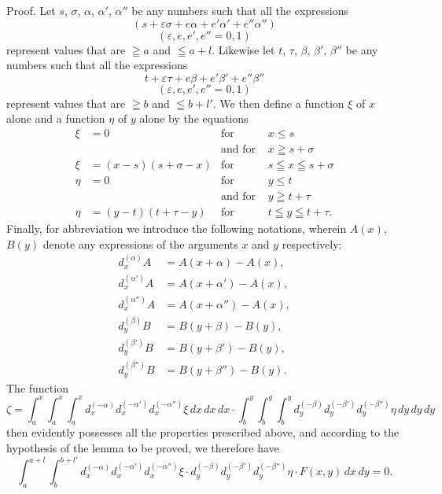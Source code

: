 \documentclass{article}
\begin{document}
Proof. Let $s$, $\sigma$, $\alpha$, $\alpha'$, $\alpha''$ be any numbers such that all the expressions
\[
(s + \varepsilon\sigma + e\alpha + e'\alpha' + e''\alpha'')
\]
\[
(\varepsilon, e, e', e'' = 0, 1)
\]
represent values that are $\geqq a$ and $\leqq a+l$. Likewise let $t$, $\tau$, $\beta$, $\beta'$, $\beta''$ be any numbers such that all the expressions
\[
t + \varepsilon\tau + e\beta + e'\beta' + e''\beta''
\]
\[
(\varepsilon, e, e', e'' = 0, 1)
\]
represent values that are $\geqq b$ and $\leqq b+l'$. We then define a function $\xi$ of $x$ alone and a function $\eta$ of $y$ alone by the equations
\[
\begin{aligned}
\xi &= 0 & \text{for } & x \le s \\
& & \text{and for } & x \geqq s + \sigma \\
\xi &= (x-s)(s+\sigma-x) & \text{for } & s \leqq x \leqq s + \sigma \\
\eta &= 0 & \text{for } & y \le t \\
& & \text{and for } & y \geqq t + \tau \\
\eta &= (y-t)(t+\tau-y) & \text{for } & t \leqq y \leqq t + \tau.
\end{aligned}
\]
Finally, for abbreviation we introduce the following notations, wherein $A(x)$, $B(y)$ denote any expressions of the arguments $x$ and $y$ respectively:
\[
\begin{aligned}
d_x^{(\alpha)} A &= A(x+\alpha) - A(x), \\
d_x^{(\alpha')} A &= A(x+\alpha') - A(x), \\
d_x^{(\alpha'')} A &= A(x+\alpha'') - A(x), \\
d_y^{(\beta)} B &= B(y+\beta) - B(y), \\
d_y^{(\beta')} B &= B(y+\beta') - B(y), \\
d_y^{(\beta'')} B &= B(y+\beta'') - B(y).
\end{aligned}
\]
The function
\[
\zeta = \int_a^x \int_a^x \int_a^x d_x^{(-\alpha)} d_x^{(-\alpha')} d_x^{(-\alpha'')} \xi\,dx\,dx\,dx \cdot \int_b^y \int_b^y \int_b^y d_y^{(-\beta)} d_y^{(-\beta')} d_y^{(-\beta'')} \eta\,dy\,dy\,dy
\]
then evidently possesses all the properties prescribed above, and according to the hypothesis of the lemma to be proved, we therefore have
\[
\int_a^{a+l} \int_b^{b+l'} d_x^{(-\alpha)} d_x^{(-\alpha')} d_x^{(-\alpha'')} \xi \cdot d_y^{(-\beta)} d_y^{(-\beta')} d_y^{(-\beta'')} \eta \cdot F(x, y)\,dx\,dy = 0.
\]
\end{document}
